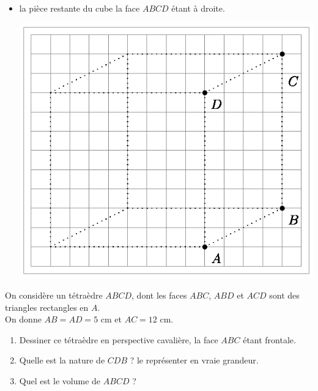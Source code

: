 \begin{exo}
\begin{multicols}{2}
\begin{itemize}
 \item la pièce restante du cube la face $ABCD$ étant à droite. 
 \begin{center}
\includegraphics{./Graphiques/piece3.eps} \end{center}
\end{itemize}
\end{multicols}\vspace{-1.5em}
\end{exo}


\begin{exo}


On considère un tétraèdre $ABCD$, dont les faces $ABC$, $ABD$ et $ACD$ sont des triangles rectangles en $A$.\\
On donne $AB = AD = 5$ cm et $AC = 12$ cm.
\begin{enumerate}
	\item Dessiner ce tétraèdre en perspective cavalière, la face $ABC$ étant frontale.
	\item Quelle est la nature de $CDB$ ? le représenter en vraie grandeur.
	\item Quel est le volume de $ABCD$ ?
\end{enumerate}
\end{exo}

